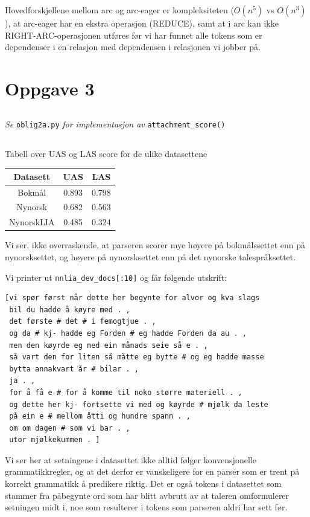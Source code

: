 \documentclass{article}
\begin{document}
Hovedforskjellene mellom arc og arc-eager er kompleksiteten ($O(n^5)$ vs $O(n^3)$), at arc-eager har en ekstra operasjon (REDUCE), samt at i arc kan ikke RIGHT-ARC-operasjonen utføres før vi har funnet alle tokens som er dependenser i en relasjon med dependensen i relasjonen vi jobber på.

\section{Oppgave 3}
\subsection{}
\textit{Se} \verb|oblig2a.py| \textit{for implementasjon av} \verb|attachment_score()|

\subsection{}
Tabell over UAS og LAS score for de ulike datasettene\newline

\begin{tabular}{ |c|c|c| }
\hline
Datasett & UAS & LAS \\
\hline
Bokmål & 0.893 & 0.798 \\
\hline
Nynorsk & 0.682 & 0.563 \\
\hline
NynorskLIA & 0.485 & 0.324 \\
\hline
\end{tabular}
\newpage
Vi ser, ikke overraskende,  at parseren scorer mye høyere på bokmålssettet enn på nynorsksettet, og høyere på nynorsksettet enn på det nynorske talespråksettet.\par


Vi printer ut \verb|nnlia_dev_docs[:10]| og får følgende utskrift:
\begin{verbatim}
[vi spør først når dette her begynte for alvor og kva slags 
 bil du hadde å køyre med . ,
 det første # det # i femogtjue . ,
 og da # kj- hadde eg Forden # eg hadde Forden da au . ,
 men den køyrde eg med ein månads seie så e . ,
 så vart den for liten så måtte eg bytte # og eg hadde masse 
 bytta annakvart år # bilar . ,
 ja . ,
 for å få e # for å komme til noko større materiell . ,
 og dette her kj- fortsette vi med og køyrde # mjølk da leste 
 på ein e # mellom åtti og hundre spann . ,
 om om dagen # som vi bar . ,
 utor mjølkekummen . ]
\end{verbatim}

Vi ser her at setningene i datasettet ikke alltid følger konvensjonelle grammatikkregler, og at det derfor er vanskeligere for en parser som er trent på korrekt grammatikk å predikere riktig. Det er også tokens i datasettet som stammer fra påbegynte ord som har blitt avbrutt av at taleren omformulerer setningen midt i, noe som resulterer i tokens som parseren aldri har sett før.
\end{document}
